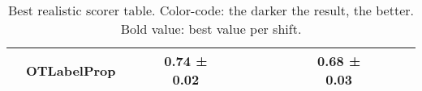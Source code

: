 \begin{table}[H]
\begin{tabular}{c|l|c|c|c|c|c|c|c|c|c|c|c|c|c|}
 & OTLabelProp & \cellcolor{red!25}{0.73 ± 0.02} & \cellcolor{red!20}{0.72 ± 0.02} & 0.74 ± 0.02 & \cellcolor{red!30}{0.68 ± 0.03} & \cellcolor{red!22}{0.72 ± 0.01} & \cellcolor{red!16}{0.74 ± 0.01} & \cellcolor{red!25}{0.66 ± 0.03} & \cellcolor{red!28}{0.67 ± 0.02} & \cellcolor{red!19}{0.78 ± 0.02} & 0.68 ± 0.03 & \cellcolor{red!21}{0.68 ± 0.01} & \cellcolor{red!18}{0.76 ± 0.02} & \cellcolor{red!23}{0.71 ± 0.04} \\
\hline
\end{tabular}
\caption{Best realistic scorer table. Color-code: the darker the result, the better. Bold value: best value per shift.}
\end{table}